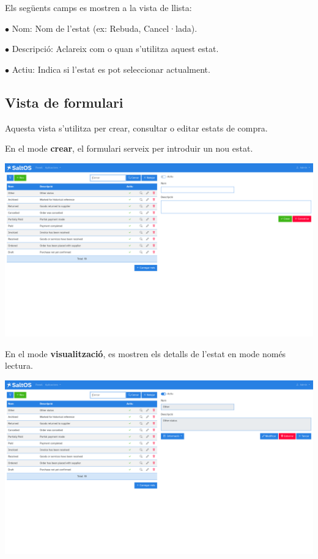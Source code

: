 \documentclass[a4paper]{article}
\begin{document}
Els següents camps es mostren a la vista de llista:

\begin{compactitem}
\item[\color{myblue}$\bullet$] Nom: Nom de l'estat (ex: Rebuda, Cancel·lada).
\item[\color{myblue}$\bullet$] Descripció: Aclareix com o quan s'utilitza aquest estat.
\item[\color{myblue}$\bullet$] Actiu: Indica si l'estat es pot seleccionar actualment.
\end{compactitem}

\hypertarget{toc124}{}
\subsection{Vista de formulari}

Aquesta vista s'utilitza per crear, consultar o editar estats de compra.

En el mode \textbf{crear}, el formulari serveix per introduir un nou estat.

\begin{center}\includegraphics[width=1\textwidth]{../ujest/snaps/test-screenshots-js-screenshots-purchases-purchase-status-create-ca-es-1-snap.png}\end{center}

En el mode \textbf{visualització}, es mostren els detalls de l'estat en mode només lectura.

\begin{center}\includegraphics[width=1\textwidth]{../ujest/snaps/test-screenshots-js-screenshots-purchases-purchase-status-view-10-ca-es-1-snap.png}\end{center}
\end{document}
